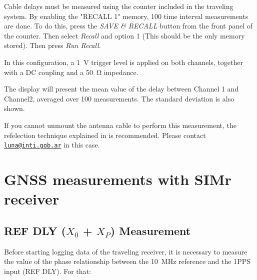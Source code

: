 \documentclass[11pt]{article}
\begin{document}
Cable delays must be measured using the counter included in the traveling system. By enabling the "RECALL 1" memory, 100 time interval measurements are done. To do this, press the \textit{SAVE \& RECALL} button from the front panel of the counter. Then select \textit{Recall} and option 1 (This should be the only memory stored). Then press \textit{Run Recall}.

In this configuration, a \SI{1}{\volt} trigger level is applied on both channels, together with a DC coupling and a \SI{50}{\ohm} impedance.


The display will present the mean value of the delay between Channel 1 and Channel2, averaged over 100 measurements. The standard deviation is also shown.

If you cannot unmount the antenna cable to perform this measurement, the refelection technique explained in \cite{Rovera} is recommended. Please contact \texttt{\url{luna@inti.gob.ar}} in this case.


\section{GNSS measurements with SIMr receiver}
\subsection{REF DLY ($X_0$ + $X_P$) Measurement}
Before starting logging data of the traveling receiver, it is necessary to measure the value of the phase relationship between the \SI{10}{\mega\hertz} reference and the 1PPS input (REF DLY). For that:
\end{document}

